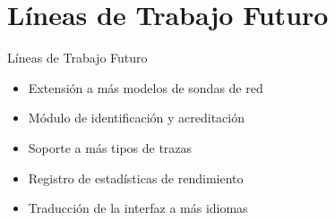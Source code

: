 \section{Líneas de Trabajo Futuro}

\begin{frame}{Líneas de Trabajo Futuro}
  \begin{itemize}
    \item Extensión a más modelos de sondas de red
    \item Módulo de identificación y acreditación
    \item Soporte a más tipos de trazas
    \item Registro de estadísticas de rendimiento
    \item Traducción de la interfaz a más idiomas
  \end{itemize}
\end{frame}
